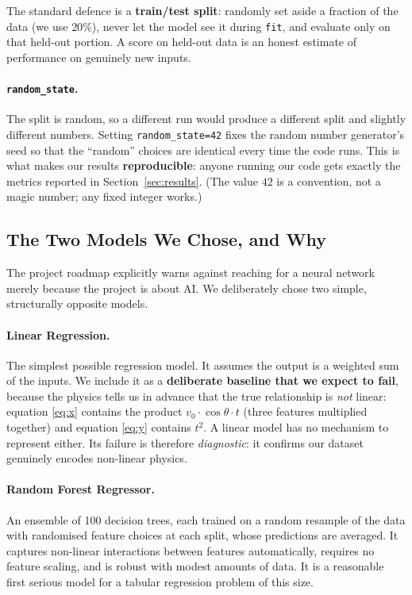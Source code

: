 \documentclass[11pt,a4paper]{article}
\newcommand{\vzero}{v_{0}}
\begin{document}
The standard defence is a \textbf{train/test split}: randomly set aside a fraction of the data (we
use $20\%$), never let the model see it during \texttt{fit}, and evaluate only on that held-out
portion. A score on held-out data is an honest estimate of performance on genuinely new inputs.

\paragraph{\texttt{random\_state}.}
The split is random, so a different run would produce a different split and slightly different
numbers. Setting \texttt{random\_state=42} fixes the random number generator's seed so that the
``random'' choices are identical every time the code runs. This is what makes our results
\textbf{reproducible}: anyone running our code gets exactly the metrics reported in
Section~\ref{sec:results}. (The value $42$ is a convention, not a magic number; any fixed integer
works.)

\subsection{The Two Models We Chose, and Why}\label{sec:modelchoice}

The project roadmap explicitly warns against reaching for a neural network merely because the
project is about AI. We deliberately chose two simple, structurally opposite models.

\paragraph{Linear Regression.}
The simplest possible regression model. It assumes the output is a weighted sum of the inputs. We
include it as a \textbf{deliberate baseline that we expect to fail}, because the physics tells us
in advance that the true relationship is \emph{not} linear: equation \eqref{eq:x} contains the
product $\vzero\cdot\cos\theta\cdot t$ (three features multiplied together) and equation
\eqref{eq:y} contains $t^{2}$. A linear model has no mechanism to represent either. Its failure is
therefore \emph{diagnostic}: it confirms our dataset genuinely encodes non-linear physics.

\paragraph{Random Forest Regressor.}
An ensemble of 100 decision trees, each trained on a random resample of the data with randomised
feature choices at each split, whose predictions are averaged. It captures non-linear interactions
between features automatically, requires no feature scaling, and is robust with modest amounts of
data. It is a reasonable first serious model for a tabular regression problem of this size.
\end{document}
